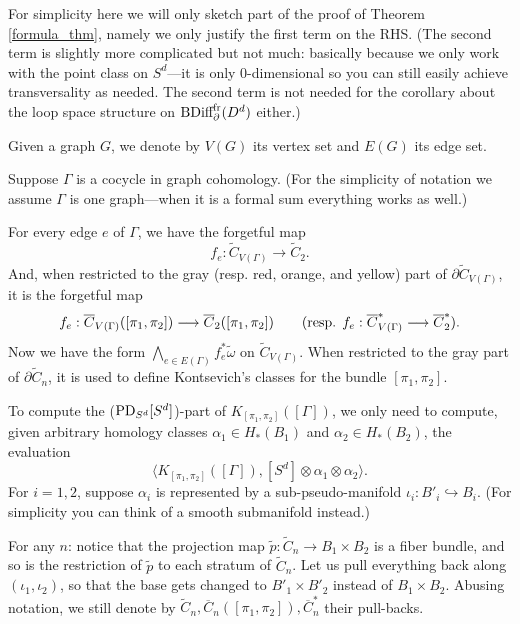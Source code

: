 \documentclass[11pt]{article}
\theoremstyle{definition}
\theoremstyle{remark}
\def\wt#1{\widetilde{#1}}
\def\ov#1{\overline{#1}}
\def\tn#1{\textnormal{#1}}
\begin{document}
For simplicity here we will only sketch part of the proof of Theorem \ref{formula_thm}, namely we only justify the first term on the RHS. 
(The second term is slightly more complicated but not much: basically because we only work with the point class on $S^d$---it is only 0-dimensional so you can still easily achieve transversality as needed. The second term is not needed for the corollary about the loop space structure on $\tn{BDiff}^{\tn{fr}}_\partial(D^d)$ either.) 

Given a graph $G$, we denote by $V(G)$ its vertex set and $E(G)$ its edge set. 

Suppose $\Gamma$ is a cocycle in graph cohomology. (For the simplicity of notation we assume $\Gamma$ is one graph---when it is a formal sum everything works as well.)

For every edge $e$ of $\Gamma$, we have the forgetful map 
$$f_e:\wt{C}_{V(\Gamma)}\longrightarrow\wt{C}_2.$$
And, when restricted to the gray (resp. red, orange, and yellow) part of $\partial\wt{C}_{V(\Gamma)}$, it is the forgetful map
$$f_e:\ov{C}_{V(\Gamma)}([\pi_1,\pi_2])\longrightarrow\ov{C}_2([\pi_1,\pi_2]) \qquad (\tn{resp. } f_e:\ov{C}^*_{V(\Gamma)}\longrightarrow\ov{C}^*_2).$$
Now we have the form $\bigwedge_{e\in E(\Gamma)}f_e^*\wt{\omega}$ on $\wt{C}_{V(\Gamma)}$. 
When restricted to the gray part of $\partial\wt{C}_n$, it is used to define Kontsevich's classes for the bundle $[\pi_1,\pi_2]$. 

To compute the ($\tn{PD}_{S^d}[S^d]$)-part of $K_{[\pi_1,\pi_2]}([\Gamma])$, we only need to compute, given arbitrary homology classes $\alpha_1\in H_*(B_1)$ and $\alpha_2\in H_*(B_2)$, the evaluation
$$\big\langle K_{[\pi_1,\pi_2]}([\Gamma]), [S^d]\otimes\alpha_1\otimes\alpha_2 \big\rangle.$$
For $i=1,2$, suppose $\alpha_i$ is represented by a sub-pseudo-manifold $\iota_i:B'_i\hookrightarrow B_i$. (For simplicity you can think of a smooth submanifold instead.)

For any $n$: notice that the projection map 
$\wt{p}:\wt{C}_n\to B_1\times B_2$
is a fiber bundle, and so is the restriction of $\wt{p}$ to each stratum of $\wt{C}_n$.
Let us pull everything back along $(\iota_1,\iota_2)$, so that the base gets changed to $B'_1\times B'_2$ instead of $B_1\times B_2$. 
Abusing notation, we still denote by
$\wt{C}_n,\ov{C}_n([\pi_1,\pi_2]),\ov{C}^*_n$
their pull-backs. 
\end{document}
